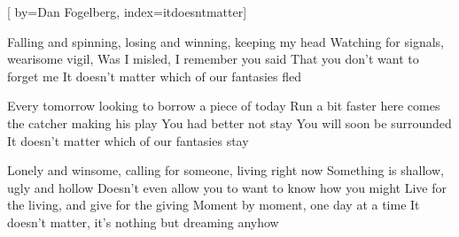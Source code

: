 
[%
    by={Dan Fogelberg},
    index={itdoesntmatter}]


    \label{itdoesntmatter}

    \beginverse
        Falling and spinning, losing and winning, keeping my head
        Watching for signals, wearisome vigil,
        Was I misled, I remember you said
        That you don't want to forget me
        It doesn't matter which of our fantasies fled
    \endverse

    \beginverse
        Every tomorrow looking to borrow a piece of today
        Run a bit faster here comes the catcher making his play
        You had better not stay
        You will soon be surrounded
        It doesn't matter which of our fantasies stay
    \endverse

    \beginverse
        Lonely and winsome, calling for someone, living right now
        Something is shallow, ugly and hollow
        Doesn't even allow you to want to know how you might
        Live for the living, and give for the giving
        Moment by moment, one day at a time
        It doesn't matter, it's nothing but dreaming anyhow
    \endverse
\endsong
